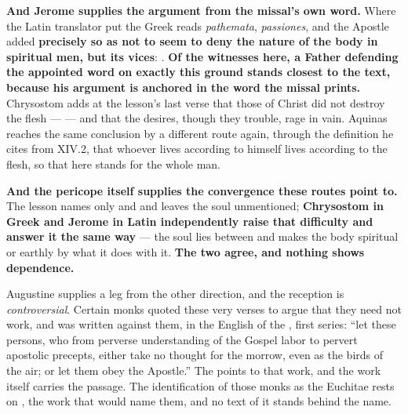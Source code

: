 \textbf{And Jerome supplies the argument from the missal's own word.} Where
the Latin translator put  the Greek reads \emph{pathemata},
\emph{passiones}, and the Apostle added  \textbf{precisely so
as not to seem to deny the nature of the body in spiritual men, but its
vices}: . \textbf{Of the witnesses here, a Father defending the appointed word on exactly
this ground stands closest to the text, because his argument is anchored in the
word the missal prints.} Chrysostom adds at the lesson's last
verse that those of Christ did not destroy the flesh ---  --- and that the desires, though they trouble, rage in vain.
Aquinas reaches the same conclusion by a different route again, through the
definition he cites from  XIV.2, that whoever lives
according to himself lives according to the flesh, so that  here
stands for the whole man.

\textbf{And the pericope itself supplies the convergence these routes point
to.} The lesson names only  and  and leaves the
soul unmentioned; \textbf{Chrysostom in Greek and Jerome in Latin
independently raise that difficulty and answer it the same way} --- the soul
lies between and makes the body spiritual or earthly by what it does with it.
\textbf{The two agree, and nothing shows dependence.}

Augustine supplies a leg from the other direction, and the reception is
\emph{controversial}. Certain monks quoted these very verses to argue
that they need not work, and  was written against
them, in the English of the , first series:
``let these persons, who from perverse understanding of the Gospel labor
to pervert apostolic precepts, either take no thought for the morrow, even as
the birds of the air; or let them obey the Apostle.'' The 
points to that work, and the work itself carries the passage. The
identification of those monks as the Euchitae rests on ,
the work that would name them, and no text of it stands behind the name.

